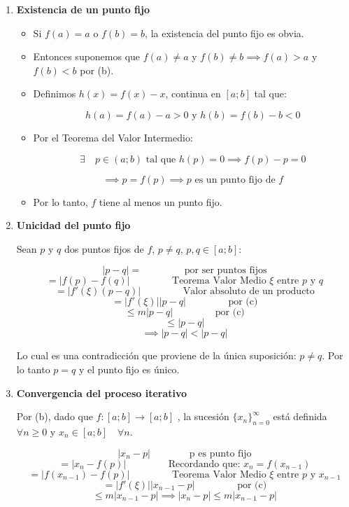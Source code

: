\documentclass[openany]{book}
\begin{document}
\begin{enumerate}
\def\labelenumi{\arabic{enumi}.}
\item
  \textbf{Existencia de un punto fijo}

  \begin{itemize}
  \item
    Si \(f(a) = a\) o \(f(b) = b\), la existencia del punto fijo es obvia.
  \item
    Entonces suponemos que \(f(a) \neq a\) y \(f(b) \neq b \implies f(a) > a\) y \(f(b) < b\) por (b).
  \item
    Definimos \(h(x) = f(x) - x\), continua en \([a; b]\) tal que:

    \[h(a) = f(a) - a > 0 \text{ y } h(b) = f(b) - b < 0\]
  \item
    Por el Teorema del Valor Intermedio:

    \[\exists \quad p \in (a; b) \text{ tal que } h(p) = 0 \implies f(p) - p = 0\]

    \[\implies p = f(p) \implies p \text{ es un punto fijo de } f\]
  \item
    Por lo tanto, \(f\) tiene al menos un punto fijo.
  \end{itemize}
\item
  \textbf{Unicidad del punto fijo}

  Sean \(p\) y \(q\) dos puntos fijos de \(f\), \(p \neq q\), \(p, q \in [a; b]\):

  \[ |p-q| = \qquad \qquad \text{ por ser puntos fijos}\]
  \[= | f(p) - f(q) | \qquad \qquad \text{ Teorema Valor Medio } \xi \text{ entre } p \text{ y } q\]
  \[= |f'(\xi) (p - q)| \qquad \qquad \text{ Valor absoluto de un producto} \]
  \[= |f'(\xi)| |p-q| \qquad \qquad \text{ por (c)}\]
  \[\leq m |p-q| \qquad \qquad \text{ por (c)}\]
  \[\leq |p-q|\]
  \[\implies |p-q| < |p-q| \]

  Lo cual es una contradicción que proviene de la única suposición: \(p \neq q\). Por lo tanto \(p = q\) y el punto fijo es único.
\item
  \textbf{Convergencia del proceso iterativo}

  Por (b), dado que \(f:[a; b] \rightarrow [a; b]\) , la sucesión \(\{x_n\}_{n=0}^{\infty}\) está definida \(\forall n \geq 0\) y \(x_n \in [a; b] \quad \forall n\).

  \[|x_n - p| \qquad \qquad \text{p es punto fijo}\]
  \[=|x_n - f(p)| \qquad \qquad \text{ Recordando que: } x_n=f(x_{n-1})\]
  \[=|f(x_{n-1}) - f(p)| \qquad \qquad \text{ Teorema Valor Medio } \xi \text{ entre } p \text{ y } x_{n-1}\]
  \[=|f'(\xi)| |x_{n-1} - p| \qquad \qquad \text{ por (c)}\]
  \[\leq m |x_{n-1} - p| \implies |x_n - p| \leq m |x_{n-1} - p|\]


\end{enumerate}
\end{document}
